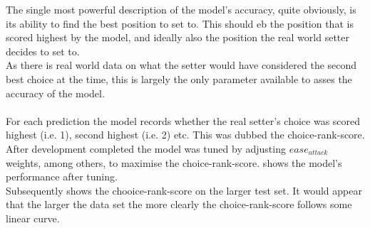 \documentclass[main.tex]{subfiles}
\begin{document}
        The single most powerful description of the model's accuracy, quite obviously, is its ability to find the best position to set to. This should eb the position that is scored highest by the model, and ideally also the position the real world setter decides to set to.\\
        As there is real world data on what the setter would have considered the second best choice at the time, this is largely the only parameter available to asses the accuracy of the model.
        \\\\
        For each prediction the model records whether the real setter's choice was scored highest (i.e. 1), second highest (i.e. 2) etc. This was dubbed the choice-rank-score. \\
        After development completed the model was tuned by adjusting \(ease_{attack}\) weights, among others, to maximise the choice-rank-score.  shows the model's performance after tuning. \\
        Subsequently  shows the chooice-rank-score on the larger test set. It would appear that the larger the data set the more clearly the choice-rank-score follows some linear curve.
        \\\\
\end{document}
